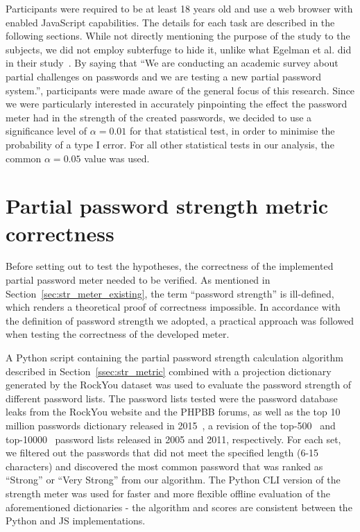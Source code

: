 Participants were required to be at least 18 years old and use a web browser with enabled JavaScript capabilities. The details for each task are described in the following sections. While not directly mentioning the purpose of the study to the subjects, we did not employ subterfuge to hide it, unlike what Egelman et al. did in their study~\cite{strength_meter_impact}. By saying that ``We are conducting an academic survey about partial challenges on passwords and we are testing a new partial password system.'', participants were made aware of the general focus of this research. Since we were particularly interested in accurately pinpointing the effect the password meter had in the strength of the created passwords, we decided to use a significance level of $\alpha = 0.01$ for that statistical test, in order to minimise the probability of a type I error. For all other statistical tests in our analysis, the common $\alpha = 0.05$ value was used.

\section{Partial password strength metric correctness}
  \label{sec:correctness}
  Before setting out to test the hypotheses, the correctness of the implemented partial password meter needed to be verified. As mentioned in Section~\ref{sec:str_meter_existing}, the term ``password strength'' is ill-defined, which renders a theoretical proof of correctness impossible. In accordance with the definition of password strength we adopted, a practical approach was followed when testing the correctness of the developed meter.

  A Python script containing the partial password strength calculation algorithm described in Section~\ref{ssec:str_metric} combined with a projection dictionary generated by the RockYou dataset was used to evaluate the password strength of different password lists. The password lists tested were the password database leaks from the RockYou website and the PHPBB forums, as well as the top 10 million passwords dictionary released in 2015~\cite{top10m_pass}, a revision of the top-500~\cite{top500_pass} and top-10000~\cite{top10000_pass} password lists released in 2005 and 2011, respectively. For each set, we filtered out the passwords that did not meet the specified length (6-15 characters) and discovered the most common password that was ranked as ``Strong'' or ``Very Strong'' from our algorithm. The Python CLI version of the strength meter was used for faster and more flexible offline evaluation of the aforementioned dictionaries - the algorithm and scores are consistent between the Python and JS implementations.

